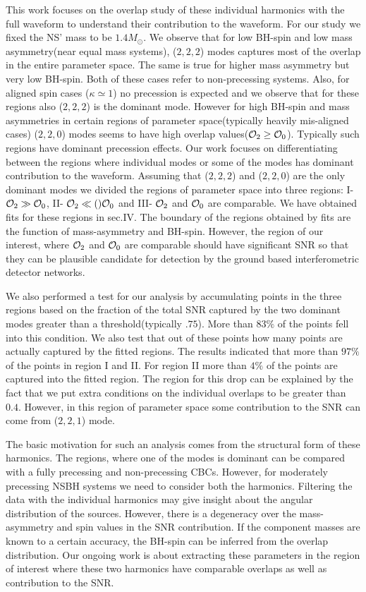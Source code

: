 \documentclass[preprint,onecolumn,,tightenlines,superscriptaddress,showpacs,nofootinbib,eqsecnum,amsfonts,amsmath]{revtex4}
\begin{document}
This work focuses on the overlap study of these individual harmonics with the
full waveform to understand their contribution to the waveform. For our study we
fixed the NS' mass to be $1.4 M_{\odot}$.  We observe that for low BH-spin and
low mass asymmetry(near equal mass systems), ($2,2,2$) modes captures most of
the overlap in the entire parameter space. The same is true for higher mass
asymmetry but  very low BH-spin. Both of these cases refer to non-precessing
systems. Also, for aligned spin cases ($\kappa \simeq 1$) no precession is
expected and we observe that for these regions also ($2,2,2$) is the  dominant
mode. However for high BH-spin and mass asymmetries in certain regions of
parameter space(typically heavily mis-aligned cases) ($2,2,0$) modes seems to
have high overlap values(${\cal{O}}_2 \geq{\cal{O}}_0$).  Typically such regions
have dominant precession effects. Our work focuses on differentiating between
the regions where individual modes or some of the modes has dominant
contribution to the waveform.  Assuming that ($2,2,2$) and ($2,2,0$) are the
only dominant modes we divided the regions of parameter space into three
regions: I- ${\cal{O}}_2 \gg {\cal{O}}_0$, II- ${\cal{O}}_2 \ll() {\cal{O}}_0$
and III- ${\cal{O}}_2$ and ${\cal{O}}_0$ are comparable. We have obtained fits
for these regions in sec.IV. The boundary of the regions obtained by fits are
the function of mass-asymmetry and BH-spin. However,  the region of our
interest, where ${\cal{O}}_2$ and ${\cal{O}}_0$ are comparable should have
significant SNR so that they can be plausible candidate for detection by the
ground based interferometric detector networks.

We also performed a test for our analysis by accumulating points in the three
regions based on the fraction of the total SNR captured by the two dominant
modes  greater than a threshold(typically $.75$). More than $83\%$ of the points
fell into this condition. We also test that out of these points how many points
are actually captured by the fitted regions. The results indicated that more
than $97\%$ of the points in region I and II. For region II more than $4\%$ of
the points are captured into the fitted region. The region for this drop can be
explained by the fact that  we put extra conditions on the individual overlaps
to be greater than $0.4$. However, in this region of parameter space some
contribution to the SNR can come from ($2,2,1$) mode.

The basic motivation for such an analysis comes from the structural form of
these harmonics. The regions, where one of the modes is dominant can be compared
with a fully precessing and non-precessing CBCs. However, for moderately
precessing NSBH systems we need to consider both the harmonics. Filtering the
data with the individual harmonics may give insight about  the angular
distribution of the sources. However, there is a degeneracy over the mass-
asymmetry and spin values in the SNR contribution. If the component masses are
known to a certain accuracy, the BH-spin  can be inferred from the overlap
distribution. Our ongoing work is about extracting these parameters in the
region of interest where these two harmonics have comparable overlaps as well as
contribution to the SNR.
\end{document}
